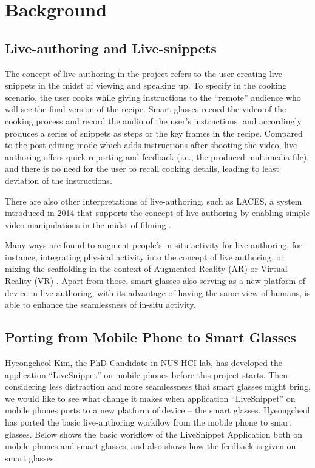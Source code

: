\documentclass[fyp]{socreport}
\begin{document}
\chapter{Background}
\section{Live-authoring and Live-snippets}
The concept of live-authoring in the project refers to the user creating live snippets in the midst of viewing and speaking up. To specify in the cooking scenario, the user cooks while giving instructions to the “remote” audience who will see the final version of the recipe. Smart glasses record the video of the cooking process and record the audio of the user’s instructions, and accordingly produces a series of snippets as steps or the key frames in the recipe. Compared to the post-editing mode which adds instructions after shooting the video, live-authoring offers quick reporting and feedback (i.e., the produced multimedia file), and there is no need for the user to recall cooking details, leading to least deviation of the instructions.

There are also other interpretations of live-authoring, such as LACES, a system introduced in 2014 that supports the concept of live-authoring by enabling simple video manipulations in the midst of filming \cite{freeman2014laces}. 

Many ways are found to augment people’s in-situ activity for live-authoring, for instance, integrating physical activity into the concept of live authoring, or mixing the scaffolding in the context of Augmented Reality (AR) or Virtual Reality (VR) \cite{chen2016augmented,sweeney2018using}. Apart from those, smart glasses also serving as a new platform of device in live-authoring, with its advantage of having the same view of humans, is able to enhance the seamlessness of in-situ activity. 

\section{Porting from Mobile Phone to Smart Glasses}
Hyeongcheol Kim, the PhD Candidate in NUS HCI lab, has developed the application “LiveSnippet” on mobile phones before this project starts. Then considering less distraction and more seamlessness that smart glasses might bring, we would like to see what change it makes when application “LiveSnippet” on mobile phones ports to a new platform of device -- the smart glasses. Hyeongcheol has ported the basic live-authoring workflow from the mobile phone to smart glasses. Below shows the basic workflow of the LiveSnippet Application both on mobile phones and smart glasses, and also shows how the feedback is given on smart glasses.
\end{document}
